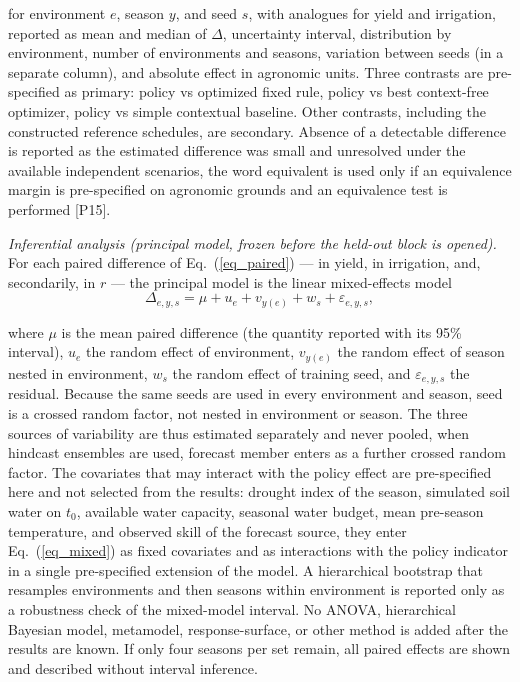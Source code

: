 \documentclass[times,final,authoryear]{elsarticle}
\begin{document}
for environment $e$, season $y$, and seed $s$, with analogues for yield and irrigation, reported as mean and median of $\Delta$, uncertainty interval, distribution by environment, number of environments and seasons, variation between seeds (in a separate column), and absolute effect in agronomic units. Three contrasts are pre-specified as primary: policy vs optimized fixed rule, policy vs best context-free optimizer, policy vs simple contextual baseline. Other contrasts, including the constructed reference schedules, are secondary. Absence of a detectable difference is reported as the estimated difference was small and unresolved under the available independent scenarios, the word equivalent is used only if an equivalence margin is pre-specified on agronomic grounds and an equivalence test is performed [P15].

\emph{Inferential analysis (principal model, frozen before the held-out block is opened).} For each paired difference of Eq.~(\ref{eq_paired}) --- in yield, in irrigation, and, secondarily, in $r$ --- the principal model is the linear mixed-effects model
\begin{equation}

\Delta_{e,y,s} = \mu + u_e + v_{y(e)} + w_s + \varepsilon_{e,y,s},

\label{eq_mixed}
\end{equation}

where $\mu$ is the mean paired difference (the quantity reported with its 95\% interval), $u_e$ the random effect of environment, $v_{y(e)}$ the random effect of season nested in environment, $w_s$ the random effect of training seed, and $\varepsilon_{e,y,s}$ the residual. Because the same seeds are used in every environment and season, seed is a crossed random factor, not nested in environment or season. The three sources of variability are thus estimated separately and never pooled, when hindcast ensembles are used, forecast member enters as a further crossed random factor. The covariates that may interact with the policy effect are pre-specified here and not selected from the results: drought index of the season, simulated soil water on $t_0$, available water capacity, seasonal water budget, mean pre-season temperature, and observed skill of the forecast source, they enter Eq.~(\ref{eq_mixed}) as fixed covariates and as interactions with the policy indicator in a single pre-specified extension of the model. A hierarchical bootstrap that resamples environments and then seasons within environment is reported only as a robustness check of the mixed-model interval. No ANOVA, hierarchical Bayesian model, metamodel, response-surface, or other method is added after the results are known. If only four seasons per set remain, all paired effects are shown and described without interval inference.
\end{document}
